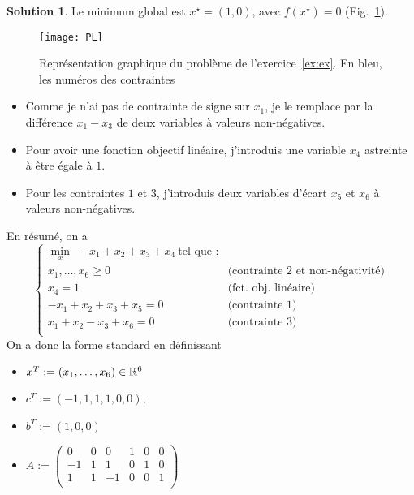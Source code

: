 \documentclass[a4paper,francais]{article}
\newcommand{\R}{{\ensuremath\mathbb{R}}}
\theoremstyle{definition}
\newtheorem*{solution}{Solution}
\begin{document}
\begin{solution}
Le minimum global est $x^\star = (1,0)$, avec $f(x^\star) = 0$ (Fig.~\ref{fig:exPL}).  
\begin{figure}
  \texttt{[image: PL]}
  \caption{Représentation graphique du problème de l'exercice~\ref{ex:ex}.
    En bleu, les numéros des contraintes}
  \label{fig:exPL}
\end{figure}
  
  \begin{itemize}
  \item Comme je n'ai pas de contrainte de signe sur $x_1$, je le remplace
    par la différence $x_1 - x_3$ de deux variables à valeurs non-négatives.
  \item Pour avoir une fonction objectif linéaire, j'introduis une variable
    $x_4$ astreinte à être égale à $1$.
  \item Pour les contraintes $1$ et $3$, j'introduis deux variables d'écart $x_5$ et $x_6$
    à valeurs non-négatives. 
  \end{itemize}
En résumé, on a 
\[
\left\{
\begin{array}{cl}
  \min_x \ -x_1 + x_2 + x_3 + x_4 \ \text{tel que :} & \\
  x_1, \dots, x_6 \geq 0 & \text{(contrainte 2 et non-négativité)} \\
  x_4 = 1 & \text{(fct. obj. linéaire)} \\
  -x_1 + x_2 + x_3 + x_5  = 0 & \text{(contrainte 1)} \\
  x_1 + x_2 - x_3 + x_6 = 0   & \text{(contrainte 3)} \\
\end{array}
\right.
\]
On a donc la forme standard en définissant
\begin{itemize}
\item $x^T := (x_1, \dots, x_6) \in \R^6$
\item $c^T := (-1, 1, 1, 1, 0, 0)$,
\item $b^T := (1, 0, 0)$
\item $A :=
  \left(
  \begin{array}{cccccc}
    0 & 0 & 0 & 1 & 0 & 0 \\
    -1 & 1 & 1 & 0 & 1 & 0 \\
    1 & 1 & -1 & 0 & 0 & 1 \\
  \end{array}
  \right)$
\end{itemize}
\end{solution}
\end{document}
